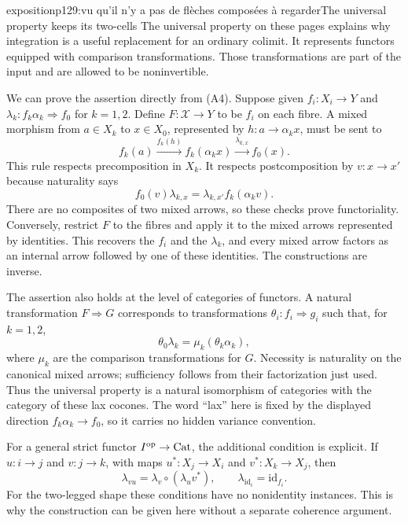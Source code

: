 \begin{dcomment}{exposition}{p129:vu qu'il n'y a pas de flèches composées à regarder}{The universal property keeps its two-cells}
The universal property on these pages explains why integration is a useful replacement for an ordinary colimit.  It represents functors equipped with comparison transformations.  Those transformations are part of the input and are allowed to be noninvertible.

We can prove the assertion directly from (A4).  Suppose given $f_i:X_i\to Y$ and $\lambda_k:f_k\alpha_k\Rightarrow f_0$ for $k=1,2$.  Define $F:\mathcal X\to Y$ to be $f_i$ on each fibre.  A mixed morphism from $a\in X_k$ to $x\in X_0$, represented by $h:a\to\alpha_kx$, must be sent to
\[
 f_k(a)\xrightarrow{f_k(h)}f_k(\alpha_kx)
       \xrightarrow{\lambda_{k,x}}f_0(x).
 \tag{A8}
\]
This rule respects precomposition in $X_k$.  It respects postcomposition by $v:x\to x'$ because naturality says
\[
 f_0(v)\lambda_{k,x}=\lambda_{k,x'}f_k(\alpha_kv).
\]
There are no composites of two mixed arrows, so these checks prove functoriality.  Conversely, restrict $F$ to the fibres and apply it to the mixed arrows represented by identities.  This recovers the $f_i$ and the $\lambda_k$, and every mixed arrow factors as an internal arrow followed by one of these identities.  The constructions are inverse.

The assertion also holds at the level of categories of functors.  A natural transformation $F\Rightarrow G$ corresponds to transformations $\theta_i:f_i\Rightarrow g_i$ such that, for $k=1,2$,
\[
 \theta_0\lambda_k=\mu_k(\theta_k\alpha_k),
\]
where $\mu_k$ are the comparison transformations for $G$.  Necessity is naturality on the canonical mixed arrows; sufficiency follows from their factorization just used.  Thus the universal property is a natural isomorphism of categories with the category of these lax cocones.  The word ``lax'' here is fixed by the displayed direction $f_k\alpha_k\to f_0$, so it carries no hidden variance convention.

For a general strict functor $I^{\mathrm{op}}\to\mathrm{Cat}$, the additional condition is explicit.  If $u:i\to j$ and $v:j\to k$, with maps $u^*:X_j\to X_i$ and $v^*:X_k\to X_j$, then
\[
 \lambda_{vu}=\lambda_v\circ(\lambda_u v^*),
 \qquad \lambda_{\mathrm{id}_i}=\mathrm{id}_{f_i}.
\]
For the two-legged shape these conditions have no nonidentity instances.  This is why the construction can be given here without a separate coherence argument.


\end{dcomment}
